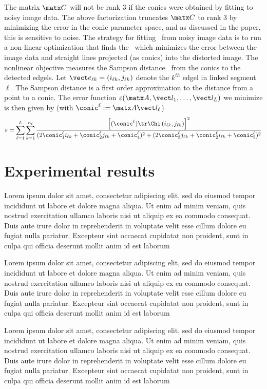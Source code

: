\documentclass[extendedabs]{bmvc2k}
\begin{document}
The matrix $\matx C$ will not be rank 3 if the conics were obtained by
fitting to noisy image data.  The above factorization truncates $\matx C$
to rank 3 by minimizing the error in the conic parameter space, and as
discussed in the paper, this is sensitive to noise.  The strategy for
fitting \A\ from noisy image data is to run a non-linear optimization that
finds the \A\ which minimizes the error between the image data and straight
lines projected (as conics) into the distorted image.  The nonlinear
objective measures the Sampson distance~\cite{Hartley00} from the conics to
the detected edgels.  Let $\vect e_{\ell k} = (i_{\ell k},j_{\ell k})$
denote the $k^{th}$ edgel in linked segment $\ell$. The Sampson distance is
a first order approximation to the distance from a point to a conic. The
error function $\varepsilon(\matx A, \vect l_1, \ldots, \vect l_L)$ we
minimize is then given by (with $\conic^\ell := \matx A \vect l_\ell$)
\begin{equation}
\def\t#1{\conic^\ell_{#1}}
\varepsilon =
\sum_{\ell = 1}^{L} \sum_{k=1}^{n_\ell }
\frac
{\left[(\conic^\ell)\tr\Chi\left(i_{\ell k},j_{\ell k}\right)\right]^2}
{(2\t1 i_{\ell k} + \t2 j_{\ell k} + \t4)^2 + (2\t3 j_{\ell k} +
\t2 i_{\ell k} + \t5)^2}
\nonumber
\end{equation}

\section{Experimental results}
  Lorem ipsum dolor sit amet, consectetur adipiscing elit, sed do eiusmod tempor incididunt ut labore et dolore magna aliqua. Ut enim ad minim veniam, quis nostrud exercitation ullamco laboris nisi ut aliquip ex ea commodo consequat. Duis aute irure dolor in reprehenderit in voluptate velit esse cillum dolore eu fugiat nulla pariatur. Excepteur sint occaecat cupidatat non proident, sunt in culpa qui officia deserunt mollit anim id est laborum

  Lorem ipsum dolor sit amet, consectetur adipiscing elit, sed do eiusmod tempor incididunt ut labore et dolore magna aliqua. Ut enim ad minim veniam, quis nostrud exercitation ullamco laboris nisi ut aliquip ex ea commodo consequat. Duis aute irure dolor in reprehenderit in voluptate velit esse cillum dolore eu fugiat nulla pariatur. Excepteur sint occaecat cupidatat non proident, sunt in culpa qui officia deserunt mollit anim id est laborum

  Lorem ipsum dolor sit amet, consectetur adipiscing elit, sed do eiusmod tempor incididunt ut labore et dolore magna aliqua. Ut enim ad minim veniam, quis nostrud exercitation ullamco laboris nisi ut aliquip ex ea commodo consequat. Duis aute irure dolor in reprehenderit in voluptate velit esse cillum dolore eu fugiat nulla pariatur. Excepteur sint occaecat cupidatat non proident, sunt in culpa qui officia deserunt mollit anim id est laborum

\end{document}
